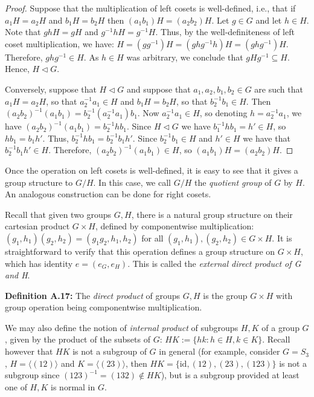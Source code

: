 \documentclass[12pt]{article}
\newcommand{\vs}{\vskip10pt}
\begin{document}
	\begin{proof}
		
		Suppose that the multiplication of left cosets is well-defined, i.e., that if $a_1H = a_2H$ and $b_1 H = b_2 H$ then $(a_1 b_1)H = (a_2 b_2)H$. Let $g \in G$ and let $h \in H$. Note that $ghH = gH$ and $g^{-1}hH = g^{-1}H$. Thus, by the well-definiteness of left coset multiplication, we have: $H = (gg^{-1})H = (ghg^{-1}h)H = (ghg^{-1})H$. Therefore, $ghg^{-1} \in H$. As $h \in H$ was arbitrary, we conclude that $gHg^{-1} \subseteq H$. Hence, $H \triangleleft G$. 
		
		\vs 
		
		Conversely, suppose that $H \triangleleft G$ and suppose that $a_1,a_2,b_1,b_2 \in G$ are such that $a_1 H = a_2 H$, so that $a_2^{-1}a_1 \in H$ and $b_1 H = b_2 H$, so that $b_2^{-1}b_1 \in H$. Then $(a_2 b_2)^{-1} (a_1 b_1) = b_2^{-1} (a_2^{-1} a_1) b_1$. Now $a_2^{-1}a_1 \in H$, so denoting $h = a_2^{-1}a_1$, we have $(a_2 b_2)^{-1} (a_1 b_1) = b_2^{-1} h b_1$. Since $H \triangleleft G$ we have $b_1^{-1}h b_1 = h' \in H$, so $h b_1 = b_1 h'$. Thus, $b_2^{-1} h b_1 = b_2^{-1} b_1 h'$. Since $b_2^{-1}b_1 \in H$ and $h' \in H$ we have that $b_2^{-1} b_1 h' \in H$. Therefore, $(a_2 b_2)^{-1} (a_1 b_1) \in H$, so $(a_1 b_1)H = (a_2 b_2)H$.
		
	\end{proof}
	
	Once the operation on left cosets is well-defined, it is easy to see that it gives a group structure to $G/H$. In this case, we call $G/H$ the \textit{quotient group} of $G$ by $H$. An analogous construction can be done for right cosets. 
	
	\vs
	
	Recall that given two groups $G, H$, there is a natural group structure on their cartesian product $G \times H$, defined by componentwise multiplication: $(g_1, h_1)(g_2, h_2) = (g_1 g_2, h_1, h_2)$ for all $(g_1, h_1),(g_2, h_2) \in G \times H$. It is straightforward to verify that this operation defines a group structure on $G \times H$, which has identity $e = (e_G, e_H)$. This is called the \textit{external direct product of G and H}.
	
	\vs
	
	\textbf{Definition A.17: } The \textit{direct product} of groups $G,H$ is the group $G \times H$ with group operation being componentwise multiplication. 
	
	\vs 
	
	We may also define the notion of \textit{internal product} of subgroups $H,K$ of a group $G$, given by the product of the subsets of $G$: $HK := \{hk: h \in H, k \in K\}$. Recall however that $HK$ is not a subgroup of $G$ in general (for example, consider $G = S_3$, $H = \langle (12) \rangle$ and $K = \langle (23) \rangle$, then $HK = \{\text{id}, (12), (23), (123)\}$ is not a subgroup since $(123)^{-1} = (132) \notin HK$), but is a subgroup provided at least one of $H,K$ is normal in $G$. 
	
\end{document}
